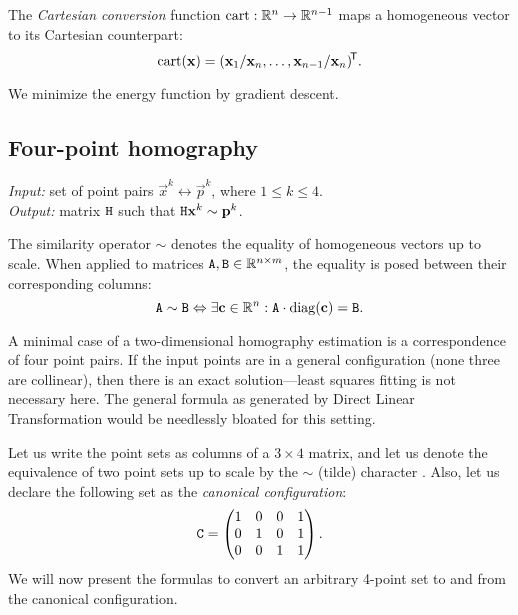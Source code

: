 \begin{definition}
The \textit{Cartesian conversion} function $\mathrm{cart}: \mathbb{R}^n \to \mathbb{R}^{n - 1}$ maps a homogeneous vector to its Cartesian counterpart:
$$
\mathrm{cart}(\mathbf{x}) = (\mathbf{x}_1 / \mathbf{x}_n, \dots, \mathbf{x}_{n - 1} / \mathbf{x}_n)^{\!\mathsf{T}}.
$$
\end{definition}

We minimize the energy function by gradient descent.

\subsection{Four-point homography}

\textit{Input:} set of point pairs $\vec x^k \leftrightarrow \vec p^k$, where $1 \leq k \leq 4$.\\
\textit{Output:} matrix $\mathtt{H}$ such that $\mathtt{H} \mathbf{x}^k \sim \mathbf{p}^k$.\\

\begin{definition}
The similarity operator $\sim$ denotes the equality of homogeneous vectors up to scale.
When applied to matrices $\mathtt{A}, \mathtt{B} \in \mathbb{R}^{n \times m}$, the equality is posed between their corresponding columns:
$$
\mathtt{A} \sim \mathtt{B} \Leftrightarrow \exists \mathbf{c} \in \mathbb{R}^n : \mathtt{A} \cdot \mathrm{diag}(\mathbf{c}) = \mathtt{B}.
$$
\end{definition}

A minimal case of a two-dimensional homography estimation is a correspondence of four point pairs.
If the input points are in a general configuration (none three are collinear), then there is an exact solution---least squares fitting is not necessary here.
The general formula as generated by Direct Linear Transformation would be needlessly bloated for this setting.


Let us write the point sets as columns of a $3 \times 4$ matrix, and let us denote the equivalence of two point sets up to scale by the $\sim$ (tilde) character .
Also, let us declare the following set as the \textit{canonical configuration}:
$$\mathtt{C} = \begin{pmatrix}
 1 & 0 & 0 & 1 \\
 0 & 1 & 0 & 1 \\
 0 & 0 & 1 & 1
 \end{pmatrix}.$$
We will now present the formulas to convert an arbitrary 4-point set to and from the canonical configuration.


